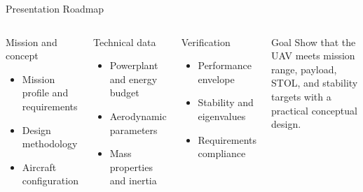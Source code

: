\documentclass[aspectratio=169,11pt]{beamer}
\begin{document}
\begin{frame}[t]{Presentation Roadmap}
\small
\begin{columns}[T,onlytextwidth]
  \begin{block}{Mission and concept}
  \begin{itemize}
    \item Mission profile and requirements
    \item Design methodology
    \item Aircraft configuration
  \end{itemize}
  \end{block}

  \begin{block}{Technical data}
  \begin{itemize}
    \item Powerplant and energy budget
    \item Aerodynamic parameters
    \item Mass properties and inertia
  \end{itemize}
  \end{block}

  \begin{block}{Verification}
  \begin{itemize}
    \item Performance envelope
    \item Stability and eigenvalues
    \item Requirements compliance
  \end{itemize}
  \end{block}

  \begin{alertblock}{Goal}
  Show that the UAV meets mission range, payload, STOL, and stability targets with a practical conceptual design.
  \end{alertblock}
\end{columns}
\end{frame}
\end{document}

